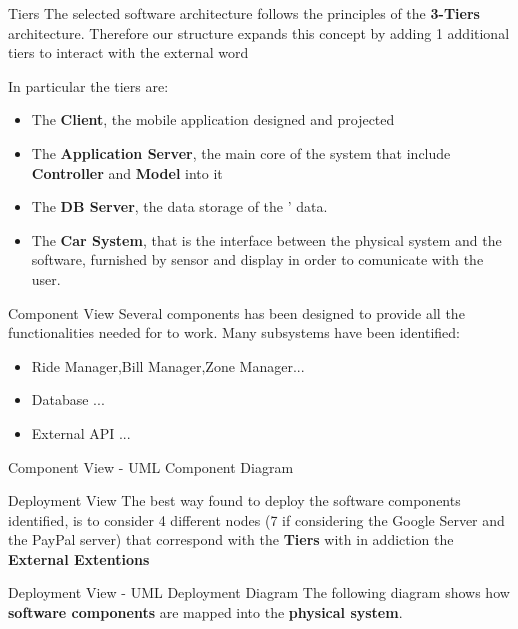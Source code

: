 \documentclass{../Common/Structure/pdf_presentation}
\begin{document}
	\begin{frame}{Tiers}
		The selected software architecture follows the principles of the \textbf{3-Tiers} architecture. Therefore our structure expands this concept by adding 1 additional tiers to interact with the external word\par
		In particular the tiers are:
		\begin{itemize}
			\item The \textbf{Client}, the mobile application designed and projected
			\item The \textbf{Application Server}, the main core of the system that include \textbf{Controller} and \textbf{Model} into it
			\item The \textbf{DB Server}, the data storage of the \PowerEnJoy{}' data.
			\item The \textbf{Car System}, that is the interface between the physical system and the software, furnished by sensor and display in order to comunicate with the user.
		\end{itemize}
	\end{frame}
	\begin{frame}{Component View}
		Several components has been designed to provide all the functionalities needed for \PowerEnJoy{} to work.
		Many subsystems have been identified:
		\begin{itemize}
			\item Ride Manager,Bill Manager,Zone Manager...
			\item Database ...
			\item External API ...
		\end{itemize}
	\end{frame}
	\begin{frame}{Component View - UML Component Diagram}
	\end{frame}
	\begin{frame}{Deployment View}
			The best way found to deploy the software components identified, is to consider 4 different nodes (7 if considering the Google Server and the
			PayPal server) that correspond with the \textbf{Tiers} with in addiction the \textbf{External Extentions}
	\end{frame}
	\begin{frame}{Deployment View - UML Deployment Diagram}
		The following diagram shows how \textbf{software components} are mapped into the \textbf{physical system}.
	\end{frame}
\end{document}
